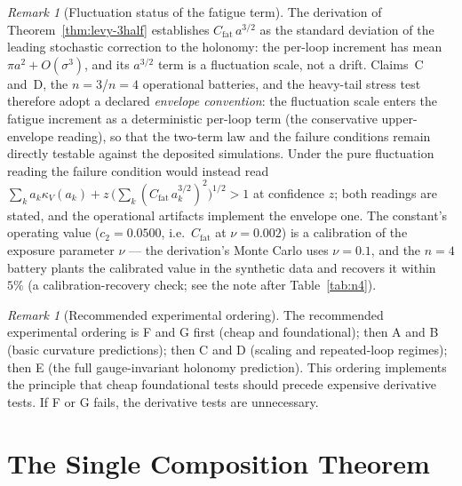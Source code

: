 \documentclass[11pt,a4paper]{article}
\theoremstyle{plain}
\theoremstyle{definition}
\theoremstyle{remark}
\newtheorem{remark}[theorem]{Remark}
\newcommand{\kk}{\kappa_{\!V}}
\begin{document}
\begin{remark}[Fluctuation status of the fatigue term]
\label{rem:fatigue-convention}
The derivation of Theorem~\ref{thm:levy-3half} establishes
$C_{\mathrm{fat}}\,a^{3/2}$ as the standard deviation of the leading
stochastic correction to the holonomy: the per-loop increment has
mean $\pi a^{2}+O(\sigma^{3})$, and its $a^{3/2}$ term is a
fluctuation scale, not a drift. Claims~C and~D, the $n=3$/$n=4$
operational batteries, and the heavy-tail stress test therefore
adopt a declared \emph{envelope convention}: the fluctuation scale
enters the fatigue increment as a deterministic per-loop term (the
conservative upper-envelope reading), so that the two-term law and
the failure conditions remain directly testable against the
deposited simulations. Under the pure fluctuation reading the
failure condition would instead read
$\sum_k a_k\kk(a_k) + z\,\bigl(\sum_k
(C_{\mathrm{fat}}\,a_k^{3/2})^{2}\bigr)^{1/2} > 1$ at confidence
$z$; both readings are stated, and the operational artifacts
implement the envelope one. The constant's operating value
($c_2=0.0500$, i.e.\ $C_{\mathrm{fat}}$ at $\nu=0.002$) is a
calibration of the exposure parameter $\nu$ --- the derivation's
Monte Carlo uses $\nu=0.1$, and the $n=4$ battery plants the
calibrated value in the synthetic data and recovers it within
$5\%$ (a calibration-recovery check; see the note after
Table~\ref{tab:n4}).
\end{remark}

\begin{remark}[Recommended experimental ordering]
\label{rem:ordering}
The recommended experimental ordering is F and G first (cheap and
foundational); then A and B (basic curvature predictions); then C and
D (scaling and repeated-loop regimes); then E (the full gauge-invariant
holonomy prediction). This ordering implements the principle that cheap
foundational tests should precede expensive derivative tests. If F or G
fails, the derivative tests are unnecessary.
\end{remark}


\section{The Single Composition Theorem}\label{sec:composition}
\end{document}
